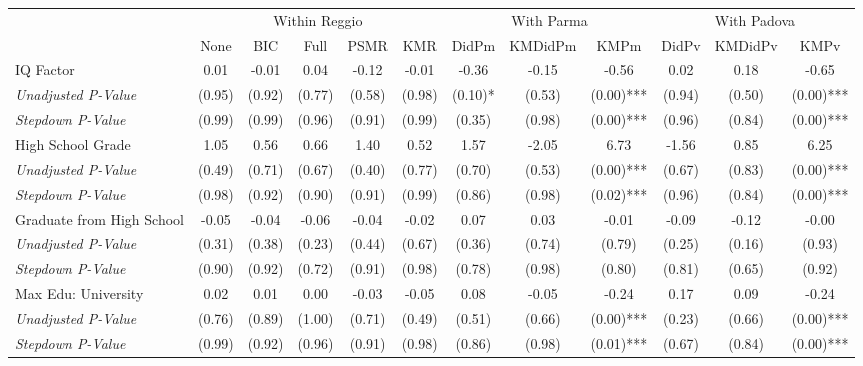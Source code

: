 \begin{tabular}{l c c c c c c c c c c c}
\toprule
& \multicolumn{5}{c}{Within Reggio} & \multicolumn{3}{c}{With Parma} & \multicolumn{3}{c}{With Padova} \\\cmidrule(lr){2-6} \cmidrule(lr){7-9} \cmidrule(lr){10-12}
 & None & BIC & Full & PSMR & KMR & DidPm & KMDidPm & KMPm & DidPv & KMDidPv & KMPv \\
\midrule
IQ Factor & 0.01 & -0.01 & 0.04 & -0.12 & -0.01 & -0.36 & -0.15 & -0.56 & 0.02 & 0.18 & -0.65 \\
\quad \textit{Unadjusted P-Value} & (0.95) & (0.92) & (0.77) & (0.58) & (0.98) & (0.10)* & (0.53) & (0.00)*** & (0.94) & (0.50) & (0.00)*** \\
\quad \textit{Stepdown P-Value} & (0.99) & (0.99) & (0.96) & (0.91) & (0.99) & (0.35) & (0.98) & (0.00)*** & (0.96) & (0.84) & (0.00)*** \\
High School Grade & 1.05 & 0.56 & 0.66 & 1.40 & 0.52 & 1.57 & -2.05 & 6.73 & -1.56 & 0.85 & 6.25 \\
\quad \textit{Unadjusted P-Value} & (0.49) & (0.71) & (0.67) & (0.40) & (0.77) & (0.70) & (0.53) & (0.00)*** & (0.67) & (0.83) & (0.00)*** \\
\quad \textit{Stepdown P-Value} & (0.98) & (0.92) & (0.90) & (0.91) & (0.99) & (0.86) & (0.98) & (0.02)*** & (0.96) & (0.84) & (0.00)*** \\
Graduate from High School & -0.05 & -0.04 & -0.06 & -0.04 & -0.02 & 0.07 & 0.03 & -0.01 & -0.09 & -0.12 & -0.00 \\
\quad \textit{Unadjusted P-Value} & (0.31) & (0.38) & (0.23) & (0.44) & (0.67) & (0.36) & (0.74) & (0.79) & (0.25) & (0.16) & (0.93) \\
\quad \textit{Stepdown P-Value} & (0.90) & (0.92) & (0.72) & (0.91) & (0.98) & (0.78) & (0.98) & (0.80) & (0.81) & (0.65) & (0.92) \\
Max Edu: University & 0.02 & 0.01 & 0.00 & -0.03 & -0.05 & 0.08 & -0.05 & -0.24 & 0.17 & 0.09 & -0.24 \\
\quad \textit{Unadjusted P-Value} & (0.76) & (0.89) & (1.00) & (0.71) & (0.49) & (0.51) & (0.66) & (0.00)*** & (0.23) & (0.66) & (0.00)*** \\
\quad \textit{Stepdown P-Value} & (0.99) & (0.92) & (0.96) & (0.91) & (0.98) & (0.86) & (0.98) & (0.01)*** & (0.67) & (0.84) & (0.00)*** \\
\bottomrule
\end{tabular}
